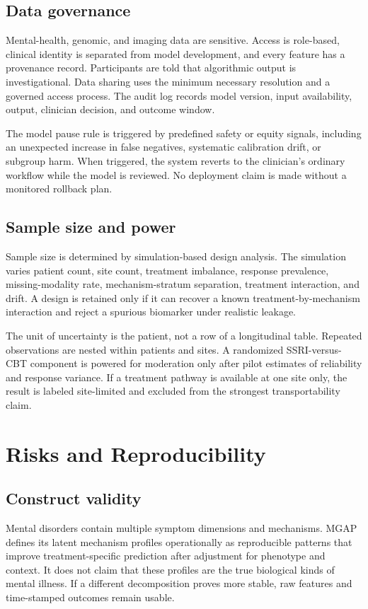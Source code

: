 \documentclass[conference]{IEEEtran}
\begin{document}
\subsection{Data governance}
Mental-health, genomic, and imaging data are sensitive. Access is role-based, clinical identity is separated from model development, and every feature has a provenance record. Participants are told that algorithmic output is investigational. Data sharing uses the minimum necessary resolution and a governed access process. The audit log records model version, input availability, output, clinician decision, and outcome window.

The model pause rule is triggered by predefined safety or equity signals, including an unexpected increase in false negatives, systematic calibration drift, or subgroup harm. When triggered, the system reverts to the clinician's ordinary workflow while the model is reviewed. No deployment claim is made without a monitored rollback plan.

\subsection{Sample size and power}
Sample size is determined by simulation-based design analysis. The simulation varies patient count, site count, treatment imbalance, response prevalence, missing-modality rate, mechanism-stratum separation, treatment interaction, and drift. A design is retained only if it can recover a known treatment-by-mechanism interaction and reject a spurious biomarker under realistic leakage.

The unit of uncertainty is the patient, not a row of a longitudinal table. Repeated observations are nested within patients and sites. A randomized SSRI-versus-CBT component is powered for moderation only after pilot estimates of reliability and response variance. If a treatment pathway is available at one site only, the result is labeled site-limited and excluded from the strongest transportability claim.

\section{Risks and Reproducibility}
\subsection{Construct validity}
Mental disorders contain multiple symptom dimensions and mechanisms. MGAP defines its latent mechanism profiles operationally as reproducible patterns that improve treatment-specific prediction after adjustment for phenotype and context. It does not claim that these profiles are the true biological kinds of mental illness. If a different decomposition proves more stable, raw features and time-stamped outcomes remain usable.
\end{document}
